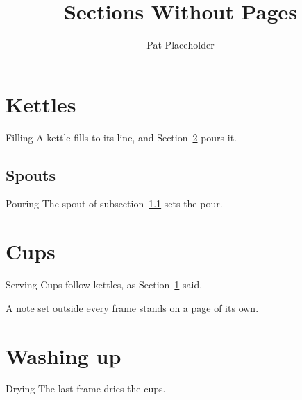 \documentclass[aspectratio=169]{beamer}
\title{Sections Without Pages}
\author{Pat Placeholder}
\date{}
\begin{document}
\maketitle

\section{Kettles}\label{sec:kettles}

\begin{frame}{Filling}
  A kettle fills to its line, and Section~\ref{sec:cups} pours it.
\end{frame}

\subsection{Spouts}\label{sec:spouts}

\begin{frame}{Pouring}
  The spout of subsection~\ref{sec:spouts} sets the pour.
\end{frame}

\section{Cups}\label{sec:cups}

\begin{frame}{Serving}
  Cups follow kettles, as Section~\ref{sec:kettles} said.
\end{frame}

A note set outside every frame stands on a page of its own.

\section*{Washing up}

\begin{frame}{Drying}
  The last frame dries the cups.
\end{frame}
\end{document}
